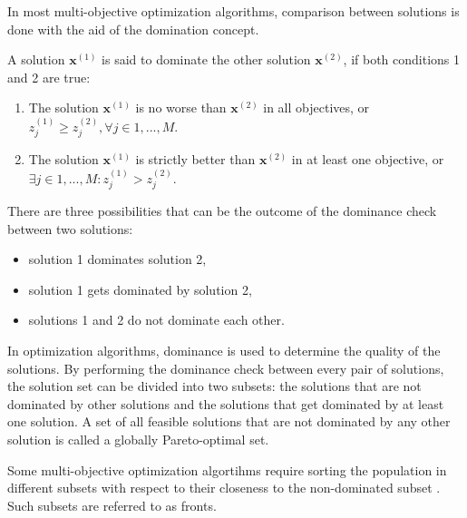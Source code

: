 In most multi-objective optimization algorithms, comparison between solutions is done with the aid of the domination concept. 

\begin{mydef}
A solution $\textbf{x}^{(1)}$ is said to dominate the other solution $\textbf{x}^{(2)}$, if both conditions 1 and 2 are true: 
\begin{enumerate}
	\item The solution $\textbf{x}^{(1)}$ is no worse than $\textbf{x}^{(2)}$ in all objectives, or $z_j^{(1)} \geq z_j^{(2)}, \forall j \in {1,...,M}$.
	\item The solution $\textbf{x}^{(1)}$ is strictly better than $\textbf{x}^{(2)}$ in at least one objective, or $\exists j \in {1,...,M}: z_j^{(1)} > z_j^{(2)}$.
\end{enumerate}
\end{mydef}
There are three possibilities that can be the outcome of the dominance check between two solutions:
\begin{itemize}
	\item solution 1 dominates solution 2, 
	\item solution 1 gets dominated by solution 2,
	\item solutions 1 and 2 do not dominate each other.
\end{itemize}

In optimization algorithms, dominance is used to determine the quality of the solutions. 
By performing the dominance check between every pair of solutions, the solution set can be divided into two subsets: the solutions that are not dominated by other solutions and the solutions that get dominated by at least one solution. 
A set of all feasible solutions that are not dominated by any other solution is called a globally Pareto-optimal set. 

Some multi-objective optimization algortihms require sorting the population in different subsets with respect to their closeness to the non-dominated subset \cite{cupic2013prirodom}. 
Such subsets are referred to as fronts. 

